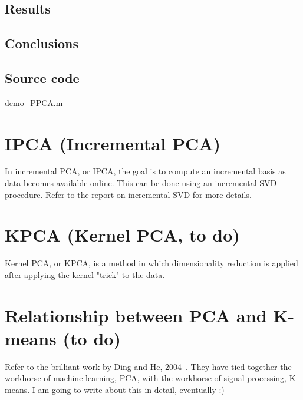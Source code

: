 \subsection{Results}

\subsection{Conclusions}

\subsection{Source code}
\scriptsize
									{demo_PPCA.m}
\normalsize

\section{IPCA (Incremental PCA)}
In incremental PCA, or IPCA, the goal is to compute an incremental basis as data becomes available online.  This can be done using an incremental SVD procedure.  Refer to the report on incremental SVD for more details.

\section{KPCA (Kernel PCA, to do)}
Kernel PCA, or KPCA, is a method in which dimensionality reduction is applied after applying the kernel "trick" to the data.

\section{Relationship between PCA and K-means (to do)}
Refer to the brilliant work by Ding and He, 2004~\cite{2004_CNF_KmeansVsPCA_DingHe}.  They have tied together the workhorse of machine learning, PCA, with the workhorse of signal processing, K-means.  I am going to write about this in detail, eventually :)










